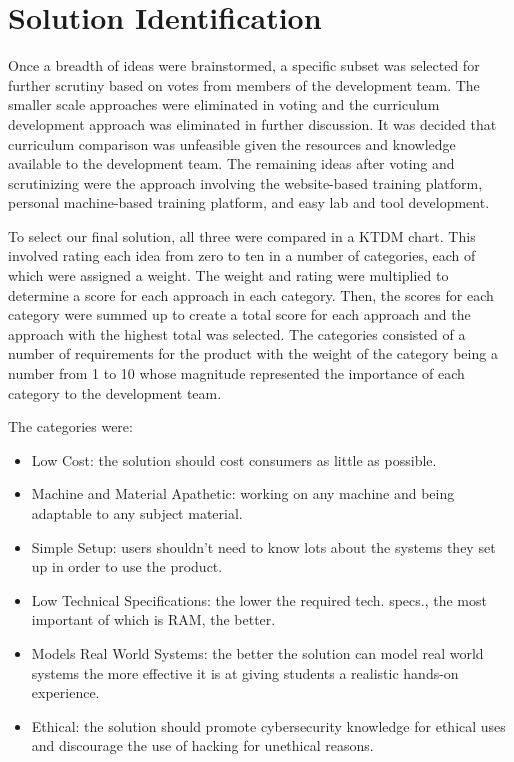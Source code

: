 \documentclass[openright]{report}
\begin{document}
\section{Solution Identification}

\par Once a breadth of ideas were brainstormed, a specific subset was selected for further scrutiny based on votes from members of the development team. The smaller scale approaches were eliminated in voting and the curriculum development approach was eliminated in further discussion. It was decided that curriculum comparison was unfeasible given the resources and knowledge available to the development team. The remaining ideas after voting and scrutinizing were the approach involving the website-based training platform, personal machine-based training platform, and easy lab and tool development. 

\par To select our final solution, all three were compared in a KTDM chart. This involved rating each idea from zero to ten in a number of categories, each of which were assigned a weight. The weight and rating were multiplied to determine a score for each approach in each category. Then, the scores for each category were summed up to create a total score for each approach and the approach with the highest total was selected. The categories consisted of a number of requirements for the product with the weight of the category being a number from 1 to 10 whose magnitude represented the importance of each category to the development team. 

The categories were:
\begin{itemize}
    \item Low Cost: the solution should cost consumers as little as possible.
    \item Machine and Material Apathetic: working on any machine and being adaptable to any subject material.
    \item Simple Setup: users shouldn't need to know lots about the systems they set up in order to use the product.
    \item Low Technical Specifications: the lower the required tech. specs., the most important of which is RAM, the better.
    \item Models Real World Systems: the better the solution can model real world systems the more effective it is at giving students a realistic hands-on experience.
    \item Ethical: the solution should promote cybersecurity knowledge for ethical uses and discourage the use of hacking for unethical reasons. 
\end{itemize}
\end{document}
